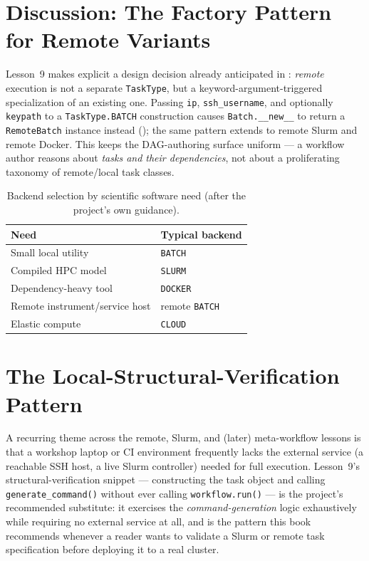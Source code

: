 \section{Discussion: The Factory Pattern for Remote Variants}

Lesson~9 makes explicit a design decision already anticipated in
: \emph{remote} execution is not a separate
\texttt{TaskType}, but a keyword-argument-triggered specialization of an
existing one. Passing \texttt{ip}, \texttt{ssh\_username}, and optionally
\texttt{keypath} to a \texttt{TaskType.BATCH} construction causes
\texttt{Batch.\_\_new\_\_} to return a \texttt{RemoteBatch} instance instead
(); the same pattern extends to remote Slurm and remote
Docker. This keeps the DAG-authoring surface uniform --- a workflow author
reasons about \emph{tasks and their dependencies}, not about a proliferating
taxonomy of remote/local task classes.

\begin{table}[h]
\centering
\caption{Backend selection by scientific software need (after the project's
own guidance).}
\label{tab:backend-selection}
\begin{tabular}{@{}ll@{}}
\toprule
\textbf{Need} & \textbf{Typical backend} \\
\midrule
Small local utility & \texttt{BATCH} \\
Compiled HPC model & \texttt{SLURM} \\
Dependency-heavy tool & \texttt{DOCKER} \\
Remote instrument/service host & remote \texttt{BATCH} \\
Elastic compute & \texttt{CLOUD} \\
\bottomrule
\end{tabular}
\end{table}

\section{The Local-Structural-Verification Pattern}

A recurring theme across the remote, Slurm, and (later) meta-workflow lessons
is that a workshop laptop or CI environment frequently lacks the external
service (a reachable SSH host, a live Slurm controller) needed for full
execution. Lesson~9's structural-verification snippet --- constructing the
task object and calling \texttt{generate\_command()} without ever calling
\texttt{workflow.run()} --- is the project's recommended substitute: it
exercises the \emph{command-generation} logic exhaustively while requiring no
external service at all, and is the pattern this book recommends whenever a
reader wants to validate a Slurm or remote task specification before
deploying it to a real cluster.


